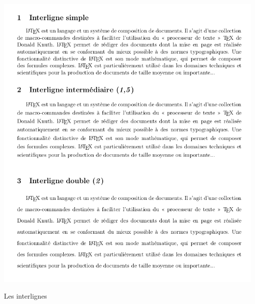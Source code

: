 \begin{table}[h]
\begin{center}
\includegraphics[scale=0.5]{IMG/interlignes.png}
\caption{Les interlignes}
\end{center}
\end{table}
\medskip

